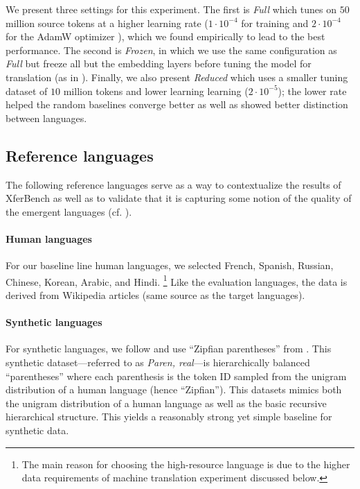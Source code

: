 We present three settings for this experiment.
The first is \emph{Full} which tunes on $50$ million source tokens at a higher learning  rate ($1\cdot10^{-4}$ for training and $2\cdot10^{-4}$ for the AdamW optimizer \citep{adam}), which we found empirically to lead to the best performance.
The second is \emph{Frozen}, in which we use the same configuration as \emph{Full} but freeze all but the embedding layers before tuning the model for translation (as in \citet{Papadimitriou2020LearningMH,artetxe-etal-2020-cross}).
Finally, we also present \emph{Reduced} which uses a smaller tuning dataset of $10$ million tokens and lower learning learning ($2\cdot10^{-5}$);
  the lower rate helped the random baselines converge better as well as showed better distinction between languages.


\subsection{Reference languages}
\unskip\label{sec:ref-langs}

The following reference languages serve as a way to contextualize the results of XferBench as well as to validate that it is capturing some notion of the quality of the emergent languages (cf. ).

\paragraph{Human languages}

For our baseline line human languages, we selected French, Spanish, Russian, Chinese, Korean, Arabic, and Hindi.
\unskip\footnote{The main reason for choosing the high-resource language is due to the higher data requirements of machine translation experiment discussed below.}
Like the evaluation languages, the data is derived from Wikipedia articles (same source as the target languages).



\paragraph{Synthetic languages}

For synthetic languages, we follow \citet{yao2022linking} and use ``Zipfian parentheses'' from \citet{Papadimitriou2020LearningMH}.
This synthetic dataset---referred to as \emph{Paren, real}---is hierarchically balanced ``parentheses'' where each parenthesis is the token ID sampled from the unigram distribution of a human language (hence ``Zipfian'').
This datasets mimics both the unigram distribution of a human language as well as the basic recursive hierarchical structure.
This yields a reasonably strong yet simple baseline for synthetic data.

